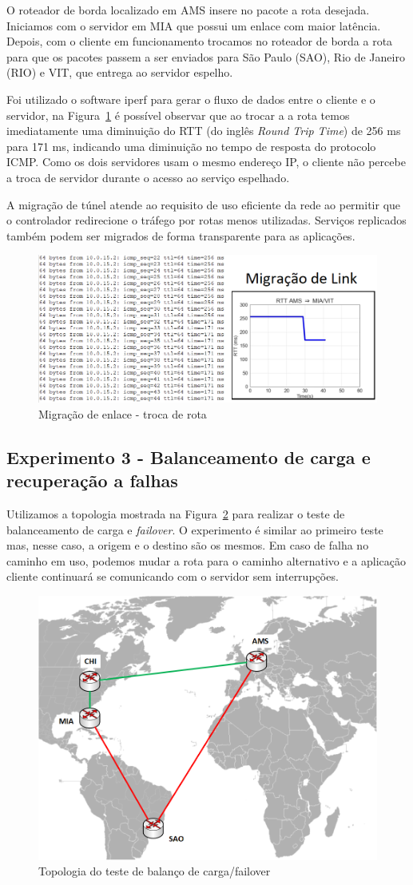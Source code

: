 \documentclass[12pt]{article}
\begin{document}
O roteador de borda localizado em AMS insere no pacote a rota desejada. Iniciamos com o servidor em MIA que possui um enlace com maior latência. Depois, com o cliente em funcionamento trocamos no roteador de borda a rota para que os pacotes passem a ser enviados para São Paulo (SAO), Rio de Janeiro (RIO) e VIT, que entrega ao servidor espelho.

Foi utilizado o software iperf para gerar o fluxo de dados entre o cliente e o servidor, na Figura~\ref{fig:migracao} é possível observar que ao trocar a a rota temos imediatamente uma diminuição do RTT (do inglês \textit{Round Trip Time}) de 256 ms para 171 ms, indicando uma diminuição no tempo de resposta do protocolo ICMP. Como os dois servidores usam o mesmo endereço IP, o cliente não percebe a troca de servidor durante o acesso ao serviço espelhado.

A migração de túnel atende ao requisito de uso eficiente da rede ao permitir que o controlador redirecione o tráfego por rotas menos utilizadas. Serviços replicados também podem ser migrados de forma transparente para as aplicações.

\begin{figure}[ht]
\centering
\includegraphics[width=.5\textwidth]{MigracaoLink.png}
\caption{Migração de enlace - troca de rota}
\label{fig:migracao}
\end{figure}


\subsection{Experimento 3 - Balanceamento de carga e recuperação a falhas}

Utilizamos a topologia mostrada na Figura~\ref{fig:topologia3} para realizar o teste de balanceamento de carga e \textit{failover}. O experimento é similar ao primeiro teste mas, nesse caso, a origem e o destino são os mesmos. Em caso de falha no caminho em uso, podemos mudar a rota para o caminho alternativo e a aplicação cliente continuará se comunicando com o servidor sem interrupções.

\begin{figure}[ht]
\centering
\includegraphics[width=.5\textwidth]{Topologias-polka 3.png}
\caption{Topologia do teste de balanço de carga/failover}
\label{fig:topologia3}
\end{figure}
\end{document}
